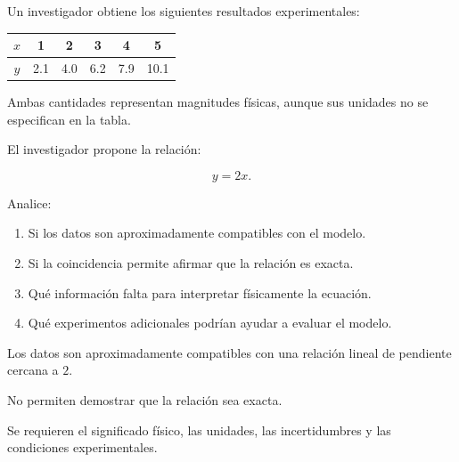 \begin{ejercicio}
Un investigador obtiene los siguientes resultados experimentales:

\begin{center}
\begin{tabular}{c|ccccc}
\hline
\(x\) & 1 & 2 & 3 & 4 & 5 \\
\hline
\(y\) & 2.1 & 4.0 & 6.2 & 7.9 & 10.1 \\
\hline
\end{tabular}
\end{center}

Ambas cantidades representan magnitudes físicas, aunque sus unidades no se especifican en la tabla.

El investigador propone la relación:

\[y=2x.\]

Analice:

\begin{enumerate}[label=\alph*)]
    \item Si los datos son aproximadamente compatibles con el modelo.
    \item Si la coincidencia permite afirmar que la relación es exacta.
    \item Qué información falta para interpretar físicamente la ecuación.
    \item Qué experimentos adicionales podrían ayudar a evaluar el modelo.
\end{enumerate}
\end{ejercicio}

\begin{respuesta}
Los datos son aproximadamente compatibles con una relación lineal de pendiente cercana a \(2\).

No permiten demostrar que la relación sea exacta.

Se requieren el significado físico, las unidades, las incertidumbres y las condiciones experimentales.
\end{respuesta}

